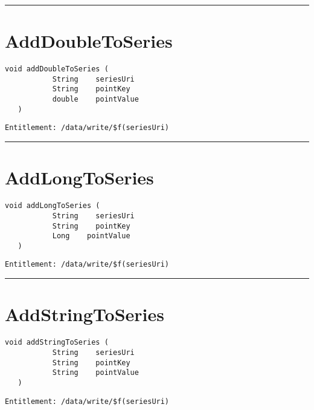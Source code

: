 \rule{12cm}{2pt}
\section{AddDoubleToSeries}
\label{Api:AddDoubleToSeries}
\begin{lstlisting}[style=nonumbers]
   void addDoubleToSeries (
           String    seriesUri
           String    pointKey
           double    pointValue
   )
\end{lstlisting}
\begin{Verbatim}[formatcom=\color{Maroon}]
  Entitlement: /data/write/$f(seriesUri)
\end{Verbatim}



\rule{12cm}{2pt}
\section{AddLongToSeries}
\label{Api:AddLongToSeries}
\begin{lstlisting}[style=nonumbers]
   void addLongToSeries (
           String    seriesUri
           String    pointKey
           Long    pointValue
   )
\end{lstlisting}
\begin{Verbatim}[formatcom=\color{Maroon}]
  Entitlement: /data/write/$f(seriesUri)
\end{Verbatim}



\rule{12cm}{2pt}
\section{AddStringToSeries}
\label{Api:AddStringToSeries}
\begin{lstlisting}[style=nonumbers]
   void addStringToSeries (
           String    seriesUri
           String    pointKey
           String    pointValue
   )
\end{lstlisting}
\begin{Verbatim}[formatcom=\color{Maroon}]
  Entitlement: /data/write/$f(seriesUri)
\end{Verbatim}




